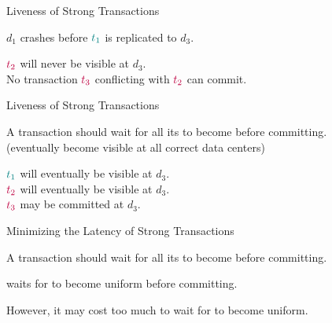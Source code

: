 \begin{frame}{Liveness of Strong Transactions}
  \begin{center}
    $d_{1}$ crashes before $\textcolor{teal}{t_{1}}$ is replicated to $d_{3}$.

    \vspace{0.50cm}

    \pause
    \vspace{0.30cm}
    $\textcolor{purple}{t_{2}}$ will never be visible at $d_{3}$. \\[3pt]
    \pause
    No transaction $\textcolor{purple}{t_{3}}$ conflicting with $\textcolor{purple}{t_{2}}$ can commit.
  \end{center}
\end{frame}

\begin{frame}{Liveness of Strong Transactions}
  \begin{center}
    A  transaction should wait for all its
     to become  before committing. \\[3pt]
    {\footnotesize (eventually become visible at all correct data centers)}

    \vspace{0.30cm}

    \pause
    $\textcolor{teal}{t_{1}}$ will eventually be visible at $d_{3}$. \\[3pt]
    \pause
    $\textcolor{purple}{t_{2}}$ will eventually be visible at $d_{3}$. \\[3pt]
    \pause
    $\textcolor{purple}{t_{3}}$ may be committed at $d_{3}$. \\[3pt]
  \end{center}
\end{frame}

\begin{frame}{Minimizing the Latency of Strong Transactions}
  \begin{center}
    A  transaction should wait for all its
     to become  before committing.

    \vspace{0.30cm}

    \pause
    \vspace{0.20cm}
     waits for  
    to become uniform before committing.

    \pause
    \vspace{0.50cm}
    However, it may cost too much to wait for  
    to become uniform.
  \end{center}
\end{frame}

